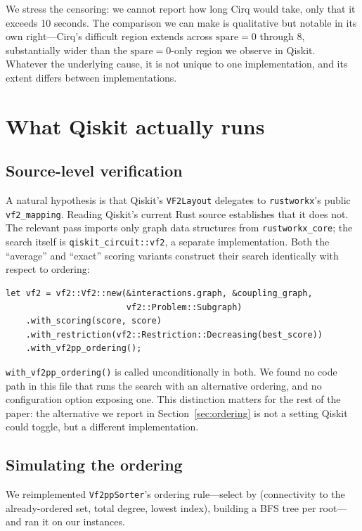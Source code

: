 \documentclass[11pt]{article}
\begin{document}
We stress the censoring: we cannot report how long Cirq would take,
only that it exceeds 10 seconds. The comparison we can make is
qualitative but notable in its own right---Cirq's difficult region
extends across $\mathrm{spare} = 0$ through $8$, substantially wider
than the $\mathrm{spare}=0$-only region we observe in Qiskit. Whatever
the underlying cause, it is not unique to one implementation, and its
extent differs between implementations.

\section{What Qiskit actually runs}
\label{sec:mechanism}

\subsection{Source-level verification}

A natural hypothesis is that Qiskit's \texttt{VF2Layout} delegates to
\texttt{rustworkx}'s public \texttt{vf2\_mapping}. Reading Qiskit's
current Rust source establishes that it does not. The relevant pass
imports only graph data structures from \texttt{rustworkx\_core}; the
search itself is \texttt{qiskit\_circuit::vf2}, a separate
implementation. Both the ``average'' and ``exact'' scoring variants
construct their search identically with respect to ordering:

\begin{verbatim}
let vf2 = vf2::Vf2::new(&interactions.graph, &coupling_graph,
                        vf2::Problem::Subgraph)
    .with_scoring(score, score)
    .with_restriction(vf2::Restriction::Decreasing(best_score))
    .with_vf2pp_ordering();
\end{verbatim}

\noindent
\texttt{with\_vf2pp\_ordering()} is called unconditionally in both. We
found no code path in this file that runs the search with an
alternative ordering, and no configuration option exposing one. This
distinction matters for the rest of the paper: the alternative we
report in Section~\ref{sec:ordering} is not a setting Qiskit could
toggle, but a different implementation.

\subsection{Simulating the ordering}

We reimplemented \texttt{Vf2ppSorter}'s ordering rule---select by
(connectivity to the already-ordered set, total degree, lowest index),
building a BFS tree per root---and ran it on our instances.
\end{document}
